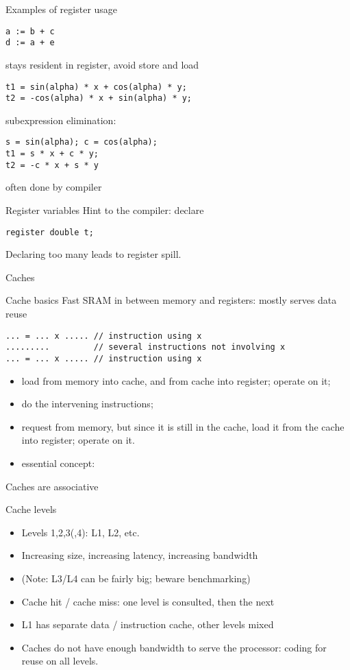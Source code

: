 \begin{frame}[fragile]{Examples of register usage}

\begin{verbatim}
a := b + c
d := a + e
\end{verbatim}
 stays resident in register, avoid store and load  

\begin{verbatim}
t1 = sin(alpha) * x + cos(alpha) * y;
t2 = -cos(alpha) * x + sin(alpha) * y;
\end{verbatim}
subexpression elimination:
\begin{verbatim}
s = sin(alpha); c = cos(alpha);
t1 = s * x + c * y;
t2 = -c * x + s * y
\end{verbatim}
often done by compiler
\end{frame}

\begin{frame}[fragile]{Register variables}
Hint to the compiler: declare 
\begin{verbatim}
register double t;
\end{verbatim}
Declaring too many leads to register spill.
\end{frame}

 {Caches}

\begin{frame}[fragile]{Cache basics}
Fast SRAM in between memory and registers: mostly serves data reuse
\begin{verbatim}
... = ... x ..... // instruction using x
.........         // several instructions not involving x
... = ... x ..... // instruction using x
\end{verbatim}
\begin{itemize}
\item load  from memory into cache, and from cache into register;
  operate on it;
\item do the intervening instructions;
\item request  from memory, but since it is still in the cache,
  load it from the cache into register; operate on it.
\item essential concept: 
\end{itemize}
Caches are associative
\end{frame}

\begin{frame}{Cache levels}
  \begin{itemize}
  \item Levels 1,2,3(,4): L1, L2, etc.
  \item Increasing size, increasing latency, increasing bandwidth
  \item (Note: L3/L4 can be fairly big; beware benchmarking)
  \item Cache hit / cache miss: one level is consulted, then the next
  \item L1 has separate data / instruction cache, other levels mixed
  \item Caches do not have enough bandwidth to serve the processor:
    coding for reuse on all levels.
  \end{itemize}
\end{frame}

